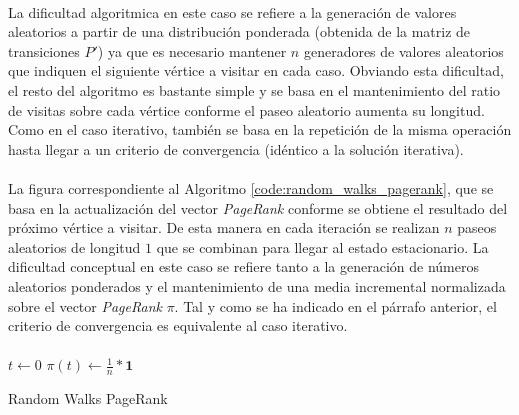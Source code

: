 \documentclass{subfiles}
\begin{document}
        \paragraph{}
        La dificultad algoritmica en este caso se refiere a la generación de valores aleatorios a partir de una distribución ponderada (obtenida de la matriz de transiciones $P'$) ya que es necesario mantener $n$ generadores de valores aleatorios que indiquen el siguiente vértice a visitar en cada caso. Obviando esta dificultad, el resto del algoritmo es bastante simple y se basa en el mantenimiento del ratio de visitas sobre cada vértice conforme el paseo aleatorio aumenta su longitud. Como en el caso iterativo, también se basa en la repetición de la misma operación hasta llegar a un criterio de convergencia (idéntico a la solución iterativa).

        \paragraph{}
        La figura correspondiente al Algoritmo \ref{code:random_walks_pagerank}, que se basa en la actualización del vector \emph{PageRank} conforme se obtiene el resultado del próximo vértice a visitar. De esta manera en cada iteración se realizan $n$ paseos aleatorios de longitud $1$ que se combinan para llegar al estado estacionario. La dificultad conceptual en este caso se refiere tanto a la generación de números aleatorios ponderados y el mantenimiento de una media incremental normalizada sobre el vector \emph{PageRank} $\pi$. Tal y como se ha indicado en el párrafo anterior, el criterio de convergencia es equivalente al caso iterativo.

        \paragraph{}
        \begin{algorithm}
          \SetAlgoLined
          $t \gets 0$\;
          $\pi(t) \gets \frac{1}{n}*\boldsymbol{1}$\;
          \caption{Random Walks PageRank}
          \label{code:random_walks_pagerank}
        \end{algorithm}
\end{document}
